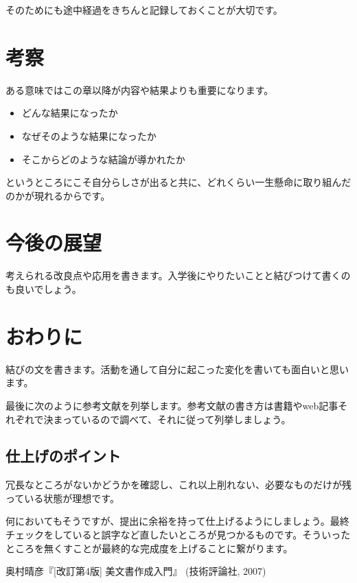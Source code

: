 \documentclass[dvipdfmx, a4paper]{jsarticle}
\begin{document}
そのためにも途中経過をきちんと記録しておくことが大切です。

\section{考察}
ある意味ではこの章以降が内容や結果よりも重要になります。
\begin{itemize}
    \item どんな結果になったか
    \item なぜそのような結果になったか
    \item そこからどのような結論が導かれたか
\end{itemize}
というところにこそ自分らしさが出ると共に、どれくらい一生懸命に取り組んだのかが現れるからです。

\section{今後の展望}
考えられる改良点や応用を書きます。入学後にやりたいことと結びつけて書くのも良いでしょう。

\section{おわりに}
結びの文を書きます。活動を通して自分に起こった変化を書いても面白いと思います。

最後に次のように参考文献を列挙します。参考文献の書き方は書籍やweb記事それぞれで決まっているので調べて、それに従って列挙しましょう。

\subsection{仕上げのポイント}
冗長なところがないかどうかを確認し、これ以上削れない、必要なものだけが残っている状態が理想です。

何においてもそうですが、提出に余裕を持って仕上げるようにしましょう。最終チェックをしていると誤字など直したいところが見つかるものです。そういったところを無くすことが最終的な完成度を上げることに繋がります。

\begin{thebibliography}{9}
\item
奥村晴彦『[改訂第4版] \LaTeXe 美文書作成入門』
(技術評論社, 2007)
\end{thebibliography}
\end{document}
